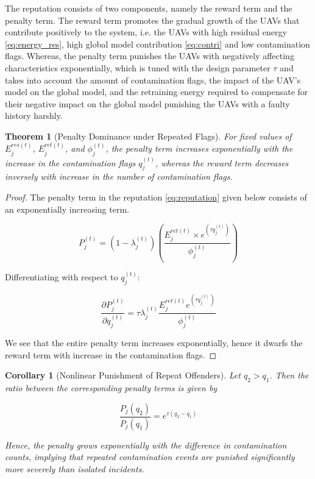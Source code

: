 \documentclass[10pt,journal,compsoc]{IEEEtran}
\newtheorem{theorem}{Theorem}
\newtheorem{coro}{Corollary}
\begin{document}
The reputation consists of two components, namely the reward term and the penalty term.
The reward term promotes the gradual growth of the UAVs that contribute positively to the system, i.e. the UAVs with high residual energy \eqref{eq:energy_res}, high global model contribution \eqref{eq:contri} and low contamination flags. 
Whereas, the penalty term punishes the UAVs with negatively affecting characteristics exponentially, which is tuned with the design parameter $\tau$ and takes into account the amount of contamination flags, the impact of the UAV's model on the global model, and the retraining energy required to compensate for their negative impact on the global model punishing the UAVs with a faulty history harshly.

\begin{theorem}[Penalty Dominance under Repeated Flags]
For fixed values of $E_j^{res(t)}$, $E_j^{ret(t)}$, and $\phi_j^{(t)}$, the penalty term increases exponentially with the increase in the contamination flags $q_j^{(t)}$, whereas the reward term decreases inversely with increase in the number of contamination flags.
\end{theorem}
 
\begin{proof}
The penalty term in the reputation \eqref{eq:reputation} given below consists of an exponentially increasing term.

\[
P_j^{(t)}
=
(1-\lambda_j^{(t)})
\left(
\frac {
E_j^{ret(t)} 
\times
e^{( \tau q_j^{(t)})}
}
{\phi_j^{(t)}}
\right)
\]

Differentiating with respect to $q_j^{(t)}$:

\[
\frac{\partial P_j^{(t)}}{\partial q_j^{(t)}}
=
\tau
\lambda_j^{(t)}
\frac{E_j^{ret(t)} e^{(\tau q_j^{(t)})}}
{\phi_j^{(t)}}
\]

We see that the entire penalty term increases exponentially, hence it dwarfs the reward term with increase in the contamination flags.
\end{proof}

\begin{coro}[Nonlinear Punishment of Repeat Offenders]
Let $q_2 > q_1$. Then the ratio between the corresponding penalty terms
is given by

\[
\frac{P_j(q_2)}{P_j(q_1)}
=
e^{\displaystyle \tau (q_2-q_1)}
\]

Hence, the penalty grows exponentially with the difference in
contamination counts, implying that repeated contamination events are
punished significantly more severely than isolated incidents.
\end{coro}
\end{document}
